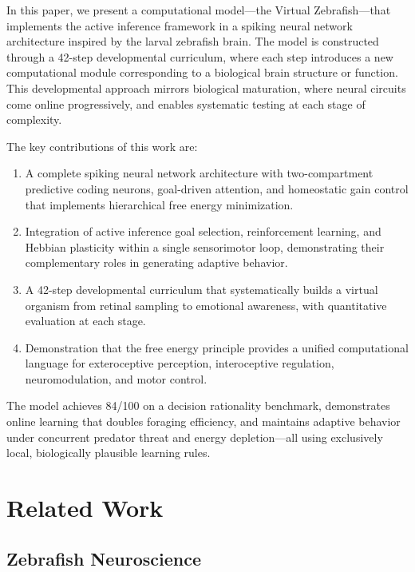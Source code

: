 \documentclass[12pt]{article}
\begin{document}
In this paper, we present a computational model---the Virtual
Zebrafish---that implements the active inference framework in a
spiking neural network architecture inspired by the larval zebrafish
brain.
The model is constructed through a 42-step developmental curriculum,
where each step introduces a new computational module corresponding
to a biological brain structure or function.
This developmental approach mirrors biological maturation, where neural
circuits come online progressively, and enables systematic testing at
each stage of complexity.

The key contributions of this work are:
\begin{enumerate}[nosep]
  \item A complete spiking neural network architecture with
    two-compartment predictive coding neurons, goal-driven attention,
    and homeostatic gain control that implements hierarchical free
    energy minimization.
  \item Integration of active inference goal selection, reinforcement
    learning, and Hebbian plasticity within a single sensorimotor loop,
    demonstrating their complementary roles in generating adaptive
    behavior.
  \item A 42-step developmental curriculum that systematically builds
    a virtual organism from retinal sampling to emotional awareness,
    with quantitative evaluation at each stage.
  \item Demonstration that the free energy principle provides a unified
    computational language for exteroceptive perception, interoceptive
    regulation, neuromodulation, and motor control.
\end{enumerate}

The model achieves 84/100 on a decision rationality benchmark,
demonstrates online learning that doubles foraging efficiency, and
maintains adaptive behavior under concurrent predator threat and
energy depletion---all using exclusively local, biologically
plausible learning rules.

\section{Related Work}\label{sec:related}

\subsection{Zebrafish Neuroscience}
\end{document}

